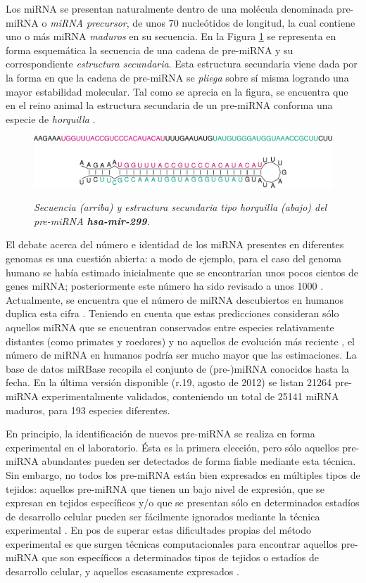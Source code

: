 \documentclass[12pt,bibliography=oldstyle,DIV=14,parskip=full-,titlepage]{scrartcl}
\begin{document}
Los miRNA se presentan naturalmente dentro de una molécula denominada
pre-miRNA o \emph{miRNA precursor}, de unos 70 nucleótidos de
longitud, la cual contiene uno o más miRNA \emph{maduros} en su
secuencia. En la Figura \ref{horquilla} se representa en forma
esquemática la secuencia de una cadena de pre-miRNA y su
correspondiente \emph{estructura secundaria}. Esta estructura
secundaria viene dada por la forma en que la cadena de pre-miRNA se
\emph{pliega} sobre sí misma logrando una mayor estabilidad
molecular. Tal como se aprecia en la figura, se encuentra que en el
reino animal la estructura secundaria de un pre-miRNA conforma una
especie de \emph{horquilla} \cite{bartel116}\cite{sewer}.
\begin{figure}[H]
\smallskip\small\slshape\center
  \includegraphics[width=.85\textwidth]{res/hsa-mir-299_ss.pdf}
  \caption{\small\slshape Secuencia
    (arriba) y estructura secundaria tipo horquilla (abajo) del
    pre-miRNA \textbf{hsa-mir-299}.  }
  \label{horquilla}
\end{figure}

El debate acerca del número e identidad de los miRNA presentes en
diferentes genomas es una cuestión abierta: a modo de ejemplo, para el
caso del genoma humano se había estimado inicialmente que se
encontrarían unos pocos cientos de genes miRNA; posteriormente este
número ha sido revisado a unos 1000 \cite{sewer}\cite{chang}.
Actualmente, se encuentra que el número de miRNA descubiertos en
humanos duplica esta cifra \cite{gomes}.  Teniendo en cuenta que estas
predicciones consideran sólo aquellos miRNA que se encuentran
conservados entre especies relativamente distantes (como primates y
roedores) y no aquellos de evolución más reciente \cite{sewer}, el
número de miRNA en humanos podría ser mucho mayor que las
estimaciones. La base de datos miRBase \cite{mirbase2}\cite{mirbase3}
recopila el conjunto de (pre-)miRNA conocidos hasta la
fecha. En la última versión disponible (r.19, agosto de 2012) se listan
21264 pre-miRNA experimentalmente validados, conteniendo un total de
25141 miRNA maduros, para 193 especies diferentes.
%

En principio, la identificación de nuevos pre-miRNA se realiza en forma
experimental en el laboratorio. Ésta es la primera elección, pero sólo
aquellos pre-miRNA abundantes pueden ser detectados de forma fiable
mediante esta técnica. Sin embargo, no todos los pre-miRNA están bien
expresados en múltiples tipos de tejidos: aquellos pre-miRNA que tienen un
bajo nivel de expresión, que se expresan en tejidos específicos y/o
que se presentan sólo en determinados estadíos de desarrollo celular
pueden ser fácilmente ignorados mediante la técnica
experimental \cite{ding}\cite{xu}.  En pos de superar estas
dificultades propias del método experimental es que surgen técnicas
computacionales para encontrar aquellos pre-miRNA que son específicos a
determinados tipos de tejidos o estadíos de desarrollo celular, y
aquellos escasamente expresados \cite{sheng}\cite{xu}.
\end{document}
